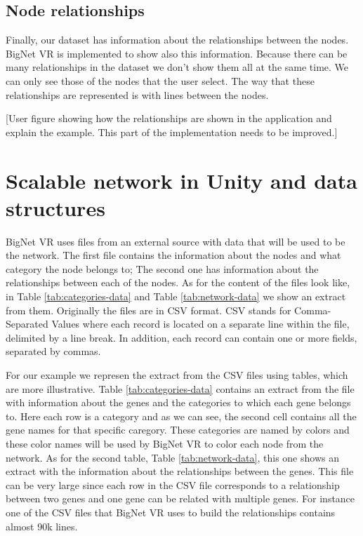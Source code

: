 \subsection{Node relationships}
Finally, our dataset has information about the relationships between the nodes. BigNet VR is implemented to show also this information. Because there can be many relationships in the dataset we don't show them all at the same time. We can only see those of the nodes that the user select. The way that these relationships are represented is with lines between the nodes.

[User figure showing how the relationships are shown in the application and explain the example. This part of the implementation needs to be improved.]


\section{Scalable network in Unity and data structures}
BigNet VR uses files from an external source with data that will be used to be the network. The first file contains the information about the nodes and what category the node belongs to; The second one has information about the relationships between each of the nodes. As for the content of the files look like, in Table \ref{tab:categories-data} and Table \ref{tab:network-data} we show an extract from them. Originally the files are in CSV format. CSV\cite{csv} stands for Comma-Separated Values where each record is located on a separate line within the file, delimited by a line break. In addition, each record can contain one or more fields, separated by commas.

For our example we represen the extract from the CSV files using tables, which are more illustrative. Table \ref{tab:categories-data} contains an extract from the file with information about the genes and the categories to which each gene belongs to. Here each row is a category and as we can see, the second cell contains all the gene names for that specific caregory. These categories are named by colors and these color names will be used by BigNet VR to color each node from the network. As for the second table, Table \ref{tab:network-data}, this one shows an extract with the information about the relationships between the genes. This file can be very large since each row in the CSV file corresponds to a relationship between two genes and one gene can be related with multiple genes. For instance one of the CSV files that BigNet VR uses to build the relationships contains almost 90k lines.


